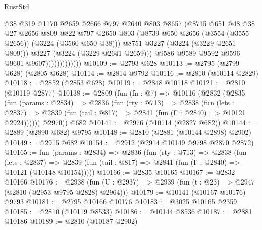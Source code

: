 \begin{lexlean}{RustStd}
\begin{coremodule}
                                @38
                                @319
                                @1170
                                @2659
                                @2666
                                @797
                                @2640
                                @803
                                @8657
                                (@8715
                                  @651
                                  @48
                                  @38
                                  @27
                                  @2656
                                  @809
                                  @822
                                  @797
                                  @2650
                                  @803
                                  (@8739 @650 @2656 (@3554 (@3555 @2656)) (@3224 (@3560 @650 @38)))
                                  @8751
                                  @3227
                                  (@3224 (@3229 @2651 @809)))
                                @3227
                                (@3224 (@3229 @2641 @2659)))
                              @9586
                              @9589
                              @9592
                              @9596
                              @9601
                              @9607)))))))))))))
@10109 := @2793 @628
@10113 := @2795 (@2799 @628) (@2805 @628)
@10114 := @2814 @9792
@10116 := @2810 (@10114 @2829)
@10118 := @2852 (@2853 @628)
@10119 := @2848 @10118
@10121 := @2810 (@10119 @2877)
@10138 := @2809
    (fun (fn : @7) =>
    @10116
      (@2832
        (@2835
          (fun (params : @2834) =>
          @2836
            (fun (rty : @713) =>
            @2838
              (fun (lets : @2837) =>
              @2839 (fun (tail : @817) => @2841 (fun (Γ : @2840) => @10121 @2924))))))
        @2970))
    @682
@10141 := @2976 (@10114 (@2827 @682))
@10144 := @2889 (@2890 @682) @9795
@10148 := @2810 (@2881 (@10144 @2898) @2902)
@10149 := @2915 @682
@10154 := @2912 (@2914 @10149 @9798 @2870 @2872)
@10165 := fun (params : @2834) =>
  @2836
    (fun (rty : @713) =>
    @2838
      (fun (lets : @2837) =>
      @2839 (fun (tail : @817) => @2841 (fun (Γ : @2840) => @10121 (@10148 @10154)))))
@10166 := @2835 @10165
@10167 := @2832 @10166
@10176 := @2938
    (fun (U : @2937) => @2939 (fun (t : @23) => @2947 (@2810 (@2953 @9795 @2828) @2964)))
@10179 := @10141 (@10167 @10176) @9793
@10181 := @2795 @10166 @10176
@10183 := @3025 @10165 @2359
@10185 := @2810 (@10119 @8533)
@10186 := @10144 @8536
@10187 := @2881 @10186
@10189 := @2810 (@10187 @2902)

\end{coremodule}
\end{lexlean}
